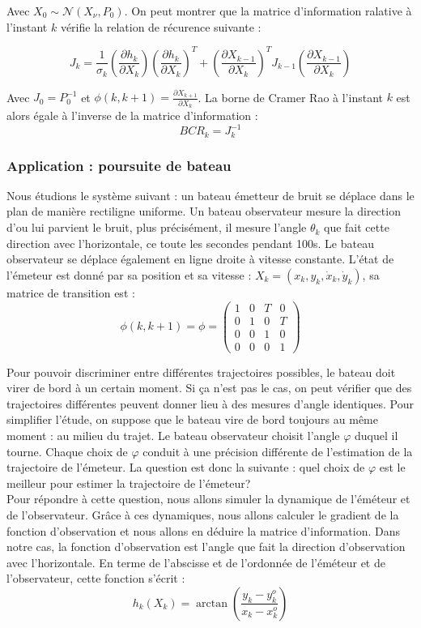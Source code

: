 \documentclass{article}
\begin{document}
Avec $X_{0} \sim  \mathcal{N} (X_{\nu},P_{0})$. On peut montrer que la matrice d'information ralative à l'instant $k$ vérifie
la relation de récurence suivante : 

\[ J_{k} = \frac{1}{\sigma_{k}}\left(\frac{\partial h_{k}}{\partial X_{k}}\right)\left(\frac{\partial h_{k}}{\partial X_{k}}\right)^{T}+\left(\frac{\partial X_{k-1}}{\partial X_{k}}\right)^{T}J_{k-1}\left(\frac{\partial X_{k-1}}{\partial X_{k}}\right)\]

Avec $J_{0}=P_{0}^{-1}$ et $\phi(k,k+1)=\frac{\partial X_{k+1}}{\partial X_{k}}$.
La borne de Cramer Rao à l'instant $k$ est alors égale à l'inverse de la matrice d'information : 
\[BCR_{k}= J_{k}^{-1}\]

\subsubsection{Application : poursuite de bateau}
Nous étudions le système suivant : un bateau émetteur de bruit se déplace dans le plan de manière rectiligne uniforme. 
Un bateau observateur mesure la direction d'ou lui parvient le bruit, plus précisément, il mesure l'angle $\theta_{k}$ que fait cette direction avec l'horizontale, ce toute les secondes pendant 100s. Le bateau observateur se déplace également en ligne droite à vitesse constante.
L'état de l'émeteur est donné par sa position et sa vitesse : $X_{k} = (x_{k},y_{k},\dot{x}_{k},\dot{y}_{k})$, sa matrice de transition est :
\[\phi(k,k+1) = \phi =  \begin{pmatrix}
  1 & 0 & T & 0 \\
  0 & 1 & 0 & T \\
  0 & 0 & 1 & 0 \\
  0 & 0 & 0 & 1 
  \end{pmatrix}\]

Pour pouvoir discriminer entre différentes
trajectoires possibles, le bateau doit virer de bord à un certain moment. Si ça n'est pas le cas, on peut vérifier que des trajectoires différentes peuvent donner lieu à des mesures d'angle identiques.
Pour simplifier l'étude, on suppose que le bateau vire de bord toujours au même moment : au milieu du trajet. Le bateau observateur choisit l'angle $\varphi $ duquel il tourne. Chaque choix de $\varphi$ 
conduit à une précision différente de l'estimation de la trajectoire  de l'émeteur.
La question est donc la suivante : quel choix de $\varphi$ est le meilleur pour estimer la trajectoire de l'émeteur?
\\
Pour répondre à cette question, nous allons simuler la dynamique de l'éméteur et de l'observateur. Grâce à ces dynamiques, nous allons
calculer le gradient de la fonction d'observation et nous allons en déduire la matrice d'information.
Dans notre cas, la fonction d'observation est l'angle que fait la direction d'observation avec l'horizontale. 
En terme de l'abscisse et de l'ordonnée de l'éméteur et de l'observateur, cette fonction s'écrit : 
\[h_{k}(X_{k})=\arctan \left(\frac{y_{k}-y_{k}^{o}}{x_{k}-x_{k}^{o}}\right)\]
\end{document}
